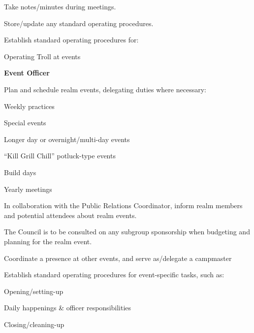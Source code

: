 \documentclass[12pt]{article}
\begin{document}
\begin{level}
\begin{level}
\begin{level}
            \item Take notes/minutes during meetings.
            \item Store/update any standard operating procedures.
            \item Establish standard operating procedures for:
            \begin{level}
                \item Operating Troll at events
            \end{level}
        \end{level}
        \item \textbf{Event Officer}
        \begin{level}
            \item Plan and schedule realm events, delegating duties where necessary:
            \begin{level}
                \item Weekly practices
                \item Special events
                \begin{level}
                    \item Longer day or overnight/multi-day events
                    \item “Kill Grill Chill” potluck-type events
                \end{level}
                \item Build days
                \item Yearly meetings
            \end{level}
            \item In collaboration with the Public Relations Coordinator, inform realm members and potential attendees about realm events.
            \item The Council is to be consulted on any subgroup sponsorship when budgeting and planning for the realm event.
            \item Coordinate a presence at other events, and serve as/delegate a campmaster
            \item Establish standard operating procedures for event-specific tasks, such as:
            \begin{level}
                \item Opening/setting-up
                \item Daily happenings \& officer responsibilities
                \item Closing/cleaning-up
            \end{level}

\end{level}
\end{level}
\end{level}
\end{document}
